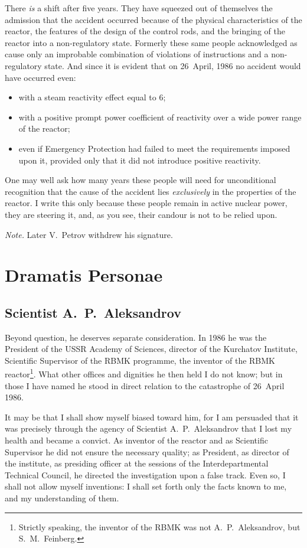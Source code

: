 \documentclass[openright]{bookest}
\begin{document}
There \textit{is} a shift after five years. They have squeezed out of themselves the admission that the accident occurred because of the physical characteristics of the reactor, the features of the design of the control rods, and the bringing of the reactor into a non-regulatory state. Formerly these same people acknowledged as cause only an improbable combination of violations of instructions and a non-regulatory state. And since it is evident that on 26~April, 1986 no accident would have occurred even:
\begin{itemize}
\item with a steam reactivity effect equal to \qty{6}{\beta};
\item with a positive prompt power coefficient of reactivity over a wide power range of the reactor;
\item even if Emergency Protection had failed to meet the requirements imposed upon it, provided only that it did not introduce positive reactivity.
\end{itemize}

One may well ask how many years these people will need for unconditional recognition that the cause of the accident lies \textit{exclusively} in the properties of the reactor. I write this only because these people remain in active nuclear power, they are steering it, and, as you see, their candour is not to be relied upon.

\textit{Note.} Later V.~Petrov withdrew his signature.

\chapter{Dramatis Personae}

\section{Scientist A.~P.~Aleksandrov}

Beyond question, he deserves separate consideration. In 1986 he was the President of the USSR Academy of Sciences, director of the Kurchatov Institute, Scientific Supervisor of the RBMK programme, the inventor of the RBMK reactor\footnote{Strictly speaking, the inventor of the RBMK was not A.~P.~Aleksandrov, but S.~M.~Feinberg.}. What other offices and dignities he then held I do not know; but in those I have named he stood in direct relation to the catastrophe of 26~April 1986.

It may be that I shall show myself biased toward him, for I am persuaded that it was precisely through the agency of Scientist A.~P.~Aleksandrov that I lost my health and became a convict. As inventor of the reactor and as Scientific Supervisor he did not ensure the necessary quality; as President, as director of the institute, as presiding officer at the sessions of the Interdepartmental Technical Council, he directed the investigation upon a false track. Even so, I shall not allow myself inventions: I shall set forth only the facts known to me, and my understanding of them.
\end{document}
